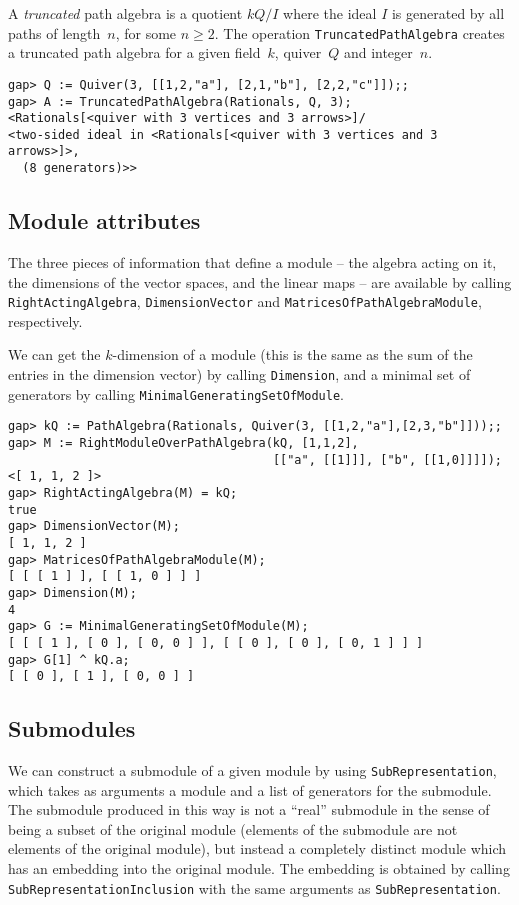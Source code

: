 \documentclass{amsart}
\theoremstyle{definition}
\newcommand{\code}[1]{\texttt{#1}}
\theoremstyle{theoretic}
\begin{document}
A \emph{truncated} path algebra is a quotient $kQ/I$ where the ideal
$I$ is generated by all paths of length~$n$, for some $n \ge 2$.  The
operation \code{TruncatedPathAlgebra} creates a truncated path algebra
for a given field~$k$, quiver~$Q$ and integer~$n$.
\begin{verbatim}
gap> Q := Quiver(3, [[1,2,"a"], [2,1,"b"], [2,2,"c"]]);;
gap> A := TruncatedPathAlgebra(Rationals, Q, 3);
<Rationals[<quiver with 3 vertices and 3 arrows>]/
<two-sided ideal in <Rationals[<quiver with 3 vertices and 3 arrows>]>, 
  (8 generators)>>
\end{verbatim}


\subsection{Module attributes}

The three pieces of information that define a module -- the algebra
acting on it, the dimensions of the vector spaces, and the linear maps
-- are available by calling \texttt{RightActingAlgebra},
\texttt{DimensionVector} and \texttt{MatricesOfPathAlgebraModule},
respectively.

We can get the $k$-dimension of a module (this is the same as the sum
of the entries in the dimension vector) by calling \texttt{Dimension},
and a minimal set of generators by calling
\texttt{MinimalGeneratingSetOfModule}.

\begin{verbatim}
gap> kQ := PathAlgebra(Rationals, Quiver(3, [[1,2,"a"],[2,3,"b"]]));;
gap> M := RightModuleOverPathAlgebra(kQ, [1,1,2],
                                     [["a", [[1]]], ["b", [[1,0]]]]);
<[ 1, 1, 2 ]>
gap> RightActingAlgebra(M) = kQ;
true
gap> DimensionVector(M);
[ 1, 1, 2 ]
gap> MatricesOfPathAlgebraModule(M);
[ [ [ 1 ] ], [ [ 1, 0 ] ] ]
gap> Dimension(M);
4
gap> G := MinimalGeneratingSetOfModule(M);
[ [ [ 1 ], [ 0 ], [ 0, 0 ] ], [ [ 0 ], [ 0 ], [ 0, 1 ] ] ]
gap> G[1] ^ kQ.a;
[ [ 0 ], [ 1 ], [ 0, 0 ] ]
\end{verbatim}

\subsection{Submodules}
\label{sec:submodules}

We can construct a submodule of a given module by using
\texttt{SubRepresentation}, which takes as arguments a module and a
list of generators for the submodule.  The submodule produced in this
way is not a ``real'' submodule in the sense of being a subset of the
original module (elements of the submodule are not elements of the
original module), but instead a completely distinct module which has
an embedding into the original module.  The embedding is obtained by
calling \texttt{SubRepresentationInclusion} with the same arguments as
\texttt{SubRepresentation}.
\end{document}
